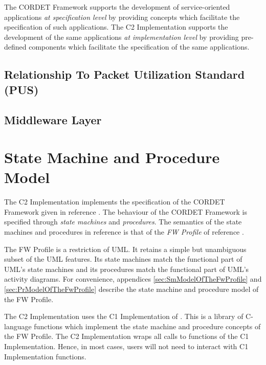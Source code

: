 \documentclass[a4paper,10pt]{article}
\let\stdsection\section
\renewcommand\section{\newpage\stdsection}
\begin{document}
The CORDET Framework supports the development of service-oriented applications \textit{at specification level} by providing concepts which facilitate the specification of such applications.
The C2 Implementation supports the development of the same applications \textit{at implementation level} by providing pre-defined components which facilitate the specification of the same applications.

\subsection{Relationship To Packet Utilization Standard (PUS)}\label{sec:RelationshipToPUS}


\subsection{Middleware Layer}\label{sec:MwLayer} 


\section{State Machine and Procedure Model}\label{sec:SmAndPrModel}
The C2 Implementation implements the specification of the CORDET Framework given in reference \cite{ref:cordetfw}. The behaviour of the CORDET Framework is specified through \textit{state machines} and \textit{procedures}. The semantics of the state machines and procedures in reference \cite{ref:cordetfw} is that of the \textit{FW Profile} of reference \cite{ref:fwprofile}. 

The FW Profile is a restriction of UML. It retains a simple but unambiguous subset of the UML features. Its state machines match the functional part of UML's state machines and its procedures match the functional part of UML's activity diagrams. For convenience, appendices \ref{sec:SmModelOfTheFwProfile} and \ref{sec:PrModelOfTheFwProfile} describe the state machine and procedure model of the FW Profile.

The C2 Implementation uses the C1 Implementation of \cite{ref:C1Implementation}. This is a library of C-language functions which implement the state machine and procedure concepts of the FW Profile. The C2 Implementation wraps all calls to functions of the C1 Implementation. Hence, in most cases, users will not need to interact with C1 Implementation functions.
\end{document}
